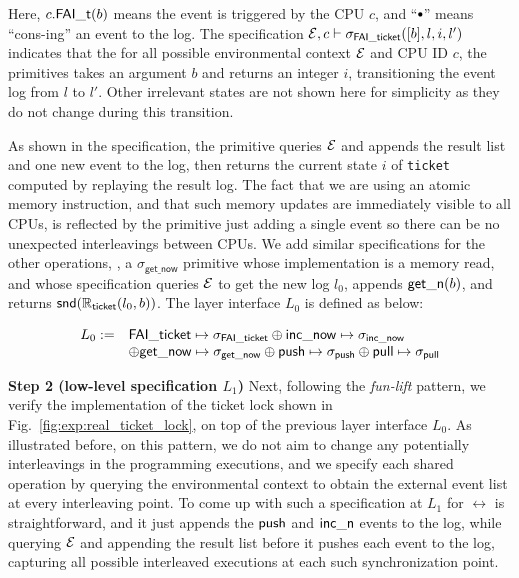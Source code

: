 \begin{mathpar}
\end{mathpar}

Here, $c.\incticket(b)$ means the event is triggered by the CPU
$c$, and ``$\cons$'' means ``cons-ing'' an event to the log.
The specification $\oracle, c \vdash  \spec_{\mathsf{FAI\_ticket}}([b], l, i, l')$
indicates that the for all possible environmental context $\oracle$ and
CPU ID $c$, the primitives takes an argument $b$ and returns an
integer $i$, transitioning the event log from $l$ to $l'$. Other
irrelevant states are not shown here for simplicity as they do not change
during this transition.

As shown in the specification,
the primitive queries $\oracle$ and appends the result list and
one new event to the log,
then returns the current state $i$ of {\tt ticket} computed by
replaying the result log.
The fact that we are
using an atomic memory instruction, and that such memory updates are
immediately visible to all CPUs, is reflected by the
primitive just adding a single event so there can be no unexpected
interleavings between CPUs. We add similar specifications for the
other operations, \eg, a $\sigma_{\mathsf{get\_now}}$ primitive whose
implementation is a memory read, and whose specification queries
$\oracle$ to get the new log $l_0$, appends $\getnow (b)$, and returns
$\mathsf{snd}(\replay_\mathsf{ticket}(l_0, b))$.
The layer interface $L_0$ is defined as below:

\[
\begin{array}{rl}
L_0 := &\mathsf{FAI\_ticket} \mapsto \spec_{\mathsf{FAI\_ticket}}
\oplus \mathsf{inc\_now} \mapsto \spec_{\mathsf{inc\_now}} \\
&\oplus \mathsf{get\_now} \mapsto \spec_{\mathsf{get\_now}}\oplus  \push\mapsto \spec_{\push}
\oplus  \pull\mapsto \spec_{\pull}
\end{array}
\]

\noindent\textbf{Step 2 (low-level specification $L_1$)}
Next, following the \emph{fun-lift} pattern,
we verify the implementation of the ticket lock shown in 
Fig.~\ref{fig:exp:real_ticket_lock}, on top of the previous
layer interface $L_0$.
As illustrated before, on this pattern, we do not aim to change
any potentially interleavings in the programming executions, and
we specify each shared operation by querying the environmental context
to obtain the external event list at every interleaving point.
To come up with such a specification at $L_1$ for $\rel$ is
straightforward, and it just appends the $\push$ and $\incnow$ events
to the log, while querying $\oracle$ and appending the result
list before it pushes each event to the log, capturing all possible
interleaved executions at each such synchronization point.


